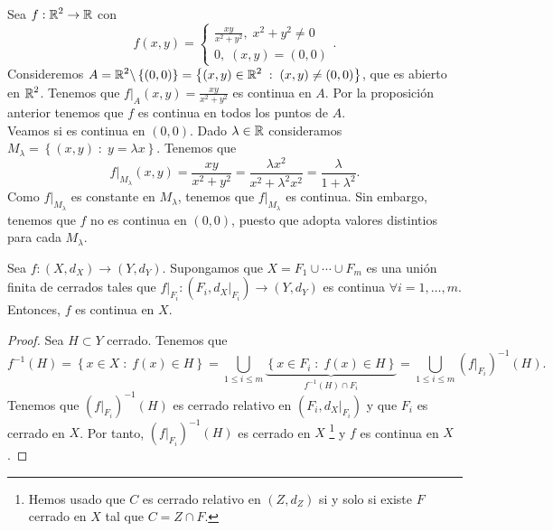 \begin{eg}
Sea $\displaystyle f : \mathbb{R}^{2} \to \mathbb{R} $ con 
\[f\left(x,y\right) = 
\begin{cases}
\frac{xy}{x^{2}+y^{2}}, \; x^{2} +y^{2} \neq 0 \\
0, \; \left(x,y\right) = \left(0,0\right)
\end{cases}
.\]
Consideremos $\displaystyle A =\mathbb{R}^{2} \backslash \left\{ \left(0,0\right)\right\} = \left\{ \left(x,y\right) \in \mathbb{R}^{2} \; : \; \left(x,y\right) \neq \left(0,0\right)\right\}  $, que es abierto en $\displaystyle \mathbb{R}^{2} $. Tenemos que $\displaystyle f|_{A}\left(x,y\right) = \frac{xy}{x^{2} +y^{2}} $ es continua en $\displaystyle A $. Por la proposición anterior tenemos que $\displaystyle f $ es continua en todos los puntos de $\displaystyle A $. \\
Veamos si es continua en $\displaystyle \left(0,0\right) $. Dado $\displaystyle \lambda \in \mathbb{R} $ consideramos $\displaystyle M_{\lambda } = \left\{ \left(x,y\right) \; : \; y = \lambda x\right\}  $. Tenemos que
\[f | _{M_{\lambda }}\left(x,y\right) = \frac{xy}{x^{2} + y^{2}} = \frac{\lambda x^{2}}{x^{2} + \lambda^{2}x^{2}} = \frac{\lambda }{1 + \lambda ^{2}} .\]
Como $\displaystyle f|_{M_{\lambda }} $ es constante en $\displaystyle M_{\lambda } $, tenemos que $\displaystyle f|_{M_{\lambda }} $ es continua. Sin embargo, tenemos que $\displaystyle f $ no es continua en $\displaystyle \left(0,0\right) $, puesto que adopta valores distintios para cada $\displaystyle M_{\lambda} $.
\end{eg}
\begin{lema}
Sea $\displaystyle f : \left(X, d _{X}\right) \to \left(Y, d _{Y}\right) $. Supongamos que $\displaystyle X = F_{1} \cup \cdots \cup F_{m} $ es una unión finita de cerrados tales que $\displaystyle f|_{F_{i}} : \left(F_{i}, d _{X}|_{F_{i}}\right) \to \left(Y, d _{Y}\right) $ es continua $\displaystyle \forall i = 1, \ldots, m $. Entonces, $\displaystyle f $ es continua en $\displaystyle X $.
\end{lema}
\begin{proof}
Sea $\displaystyle H \subset Y $ cerrado. Tenemos que 
\[f^{-1}\left(H\right) = \left\{ x \in X \; : \; f\left(x\right) \in H\right\} = \bigcup_{1 \leq i \leq m} \underbrace{\left\{ x \in F_{i} \; : \; f\left(x\right) \in H\right\}}_{f^{-1}\left(H\right) \cap F_{i}} = \bigcup_{1\leq i \leq m}\left(f|_{F_{i}}\right)^{-1}\left(H\right) .\]
Tenemos que $\displaystyle \left(f|_{F_{i}}\right)^{-1}\left(H\right) $ es cerrado relativo en $\displaystyle \left(F_{i}, d _{X}|_{F_{i}}\right) $ y que $\displaystyle F_{i} $ es cerrado en $\displaystyle X $. Por tanto, $\displaystyle \left(f|_{F_{i}}\right)^{-1}\left(H\right) $ es cerrado en $\displaystyle X $ \footnote{Hemos usado que $\displaystyle C $ es cerrado relativo en $\displaystyle \left(Z, d _{Z}\right) $ si y solo si existe $\displaystyle F $ cerrado en $\displaystyle X $ tal que $\displaystyle C = Z \cap F $.} y $\displaystyle f $ es continua en $\displaystyle X $.
\end{proof}

